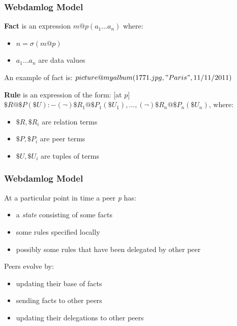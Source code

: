 \documentclass{beamer}
\begin{document}
\frame
{
	\frametitle{Webdamlog Model}
	
	\begin{block}{\textbf{Fact} is an expression $m@p(a_{1} \dots a_{n})$ where:}
	\begin{itemize}
		\item $n = \sigma(m@p)$
		\item $a_{1} \dots a_{n}$ are data values
	\end{itemize}
	An example of fact is: $picture@myalbum(1771.jpg, "Paris", 11/11/2011)$
	\end{block}	

	\begin{block}{\textbf{Rule} is an expression of the form:}
	[at $p$] $ \$R@\$P(\$U) :- (\neg) \$R_{1}@\$P_{1}(\$U_{1}), \dots , (\neg) \$R_{n}@\$P_{n}(\$U_{n}) $, where:
	\begin{itemize}
		\item $\$R, \$R_{i}$ are relation terms
		\item $\$P, \$P_{i}$ are peer terms
		\item $\$U, \$U_{i}$ are tuples of terms
	\end{itemize}
	\end{block}

}

\frame
{
	\frametitle{Webdamlog Model}
	
	At a particular point in time a peer \textit{p} has:
	\begin{itemize}
		\item a \textit{state} consisting of some facts
		\item some rules specified locally
		\item possibly some rules that have been delegated by other peer
	\end{itemize}

	Peers evolve by:
	\begin{itemize}
		\item updating their base of facts
		\item sending facts to other peers
		\item updating their delegations to other peers
	\end{itemize}

}
\end{document}
